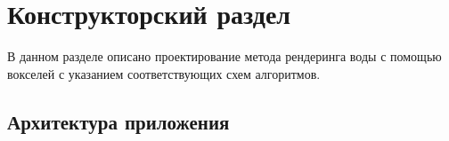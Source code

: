 \chapter{Конструкторский раздел}
\label{cha:design}

В данном разделе описано проектирование метода рендеринга воды с помощью вокселей
с указанием соответствующих схем алгоритмов.

\section{Архитектура приложения}


